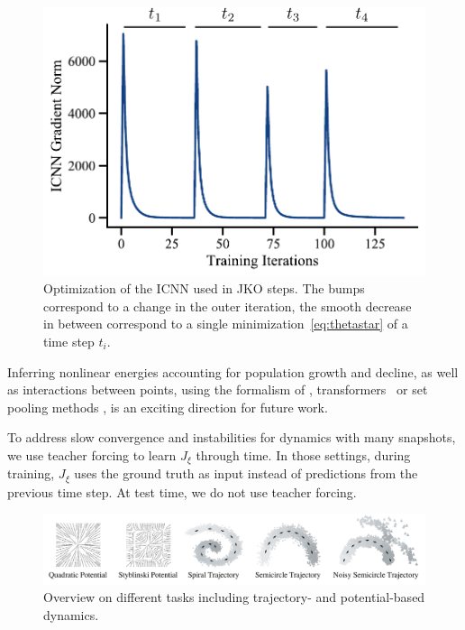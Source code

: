 \begin{figure}
    \centering
    \includegraphics[width=\textwidth]{figures/fig_optimization_icnn.pdf}
    \caption{Optimization of the ICNN used in \acrshort{JKO} steps. The bumps correspond to a change in the outer iteration, the smooth decrease in between correspond to a single minimization~\eqref{eq:thetastar} of a time step $t_i$. }
    \label{fig:training_icnn}
\end{figure}

Inferring nonlinear energies accounting for population growth and decline, as well as interactions between points, using the formalism of \citep{de2019stochastic}, transformers~\citep{vaswani2017attention} or set pooling methods \citep{edwards2016towards, zaheer2017deep}, is an exciting direction for future work.

To address slow convergence and instabilities for dynamics with many snapshots, we use teacher forcing \citep{williams1989learning} to learn $J_\xi$ through time. In those settings, during training, $J_\xi$ uses the ground truth as input instead of predictions from the previous time step. At test time, we do not use teacher forcing.

\begin{figure}[ht]
\vspace{-10pt}
\centering
\includegraphics[width=1.0\textwidth]{figures/fig_task_overview_noise.pdf}
\caption{Overview on different tasks including trajectory- and potential-based dynamics.}
\label{fig:task_overview}
\end{figure}


